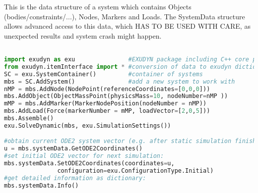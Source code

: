 \label{sec:mbs:systemData}



This is the data structure of a system which contains Objects (bodies/constraints/...), Nodes, Markers and Loads. The SystemData structure allows advanced access to this data, which HAS TO BE USED WITH CARE, as unexpected results and system crash might happen.
\pythonstyle
\begin{lstlisting}[language=Python, firstnumber=1]

import exudyn as exu               #EXUDYN package including C++ core part
from exudyn.itemInterface import * #conversion of data to exudyn dictionaries
SC = exu.SystemContainer()         #container of systems
mbs = SC.AddSystem()               #add a new system to work with
nMP = mbs.AddNode(NodePoint(referenceCoordinates=[0,0,0]))
mbs.AddObject(ObjectMassPoint(physicsMass=10, nodeNumber=nMP ))
mMP = mbs.AddMarker(MarkerNodePosition(nodeNumber = nMP))
mbs.AddLoad(Force(markerNumber = mMP, loadVector=[2,0,5]))
mbs.Assemble()
exu.SolveDynamic(mbs, exu.SimulationSettings())

#obtain current ODE2 system vector (e.g. after static simulation finished):
u = mbs.systemData.GetODE2Coordinates()
#set initial ODE2 vector for next simulation:
mbs.systemData.SetODE2Coordinates(coordinates=u,
               configuration=exu.ConfigurationType.Initial)
#get detailed information as dictionary:
mbs.systemData.Info()
\end{lstlisting}

